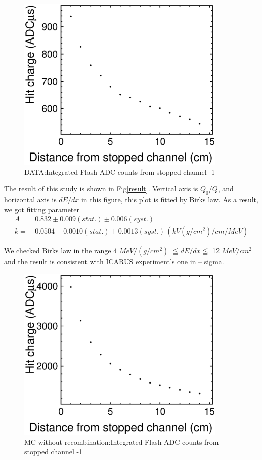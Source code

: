 \begin{figure}[!htb]
  \centering
  \centering
  \includegraphics[width=10cm,clip]{./fig/Q2.eps}
  \caption{DATA:Integrated Flash ADC counts from stopped channel -1}
  \label{fadcDist1}
\end{figure}
\pagebreak
\pagebreak

The result of this study is shown in Fig\ref{result}. Vertical axis is $Q_{0}/Q$, and horizontal axis is $dE/dx$ in this figure, this plot is fitted by Birks law.
As a result, we got fitting parameter\\
\begin{eqnarray}
 \nonumber  A =& 0.832\pm0.009(stat.)\pm0.006(syst.)\\
   k =& 0.0504\pm0.0010 (stat.)\pm0.0013(syst.)\,(kV(g/cm^{2})/cm/MeV)
\end{eqnarray}

We checked Birks law in the range 4 $MeV/(g/cm^2)$ $\leqq dE/dx \leqq$ 12 $MeV/cm^2$ and the result is consistent with ICARUS experiment's one\cite{658352} in -- sigma.

\begin{figure}[!htb]
  \centering
  \centering
  \includegraphics[width=10cm,clip]{./fig/Q_02.eps}
  \caption{MC without recombination:Integrated Flash ADC counts from stopped channel -1}
  \label{fadcDistMC}
\end{figure}

